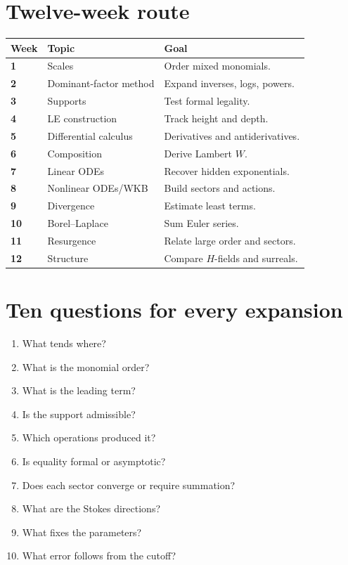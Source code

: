 \documentclass[11pt,oneside,openany]{book}
\theoremstyle{plain}
\theoremstyle{definition}
\theoremstyle{remark}
\begin{document}
\section{Twelve-week route}
\begin{center}
\begin{tabularx}{0.96\textwidth}{>{\bfseries}p{}p{}X}
\toprule
Week & Topic & Goal\\
\midrule
1 & Scales & Order mixed monomials.\\
2 & Dominant-factor method & Expand inverses, logs, powers.\\
3 & Supports & Test formal legality.\\
4 & LE construction & Track height and depth.\\
5 & Differential calculus & Derivatives and antiderivatives.\\
6 & Composition & Derive Lambert $W$.\\
7 & Linear ODEs & Recover hidden exponentials.\\
8 & Nonlinear ODEs/WKB & Build sectors and actions.\\
9 & Divergence & Estimate least terms.\\
10 & Borel--Laplace & Sum Euler series.\\
11 & Resurgence & Relate large order and sectors.\\
12 & Structure & Compare $H$-fields and surreals.\\
\bottomrule
\end{tabularx}
\end{center}

\section{Ten questions for every expansion}
\begin{enumerate}
  \item What tends where?
  \item What is the monomial order?
  \item What is the leading term?
  \item Is the support admissible?
  \item Which operations produced it?
  \item Is equality formal or asymptotic?
  \item Does each sector converge or require summation?
  \item What are the Stokes directions?
  \item What fixes the parameters?
  \item What error follows from the cutoff?
\end{enumerate}
\end{document}
